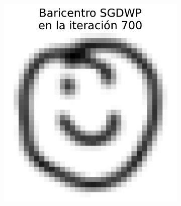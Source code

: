 \begin{figure}[H]
\begin{subfigure}[b]{0.17\textwidth}
        \label{fig:bar-SGDWP-random-walk-iter-06}
    \end{subfigure}
    \hfill
    \begin{subfigure}[b]{0.17\textwidth}
        \centering
        \includegraphics[width=\textwidth]{img/sgdwp-rw/bar-SGDWP-random-walk-iter-07.pdf}
        \label{fig:bar-SGDWP-random-walk-iter-07}
    \end{subfigure}
    \hfill
    \begin{subfigure}[b]{0.17\textwidth}
        \centering

\end{subfigure}
\end{figure}
